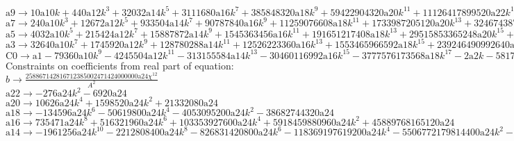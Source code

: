 \documentclass[12pt,a4paper,draft]{article}
\begin{document}
$\text{a9}\to 10 \text{a10} k+440 \text{a12} k^3+32032 \text{a14} k^5+3111680 \text{a16} k^7+385848320 \text{a18} k^9+59422904320 \text{a20} k^{11}+11126417899520 \text{a22} k^{13}+2489170300469248 \text{a24} k^{15}$\\
$\text{a7}\to 240 \text{a10} k^3+12672 \text{a12} k^5+933504 \text{a14} k^7+90787840 \text{a16} k^9+11259076608 \text{a18} k^{11}+1733987205120 \text{a20} k^{13}+324674387017728 \text{a22} k^{15}+72635234665365504 \text{a24} k^{17}+8 \text{a8} k$\\
$\text{a5}\to 4032 \text{a10} k^5+215424 \text{a12} k^7+15887872 \text{a14} k^9+1545363456 \text{a16} k^{11}+191651217408 \text{a18} k^{13}+29515853365248 \text{a20} k^{15}+5526593941929984 \text{a22} k^{17}+1236393972835811328 \text{a24} k^{19}+6 \text{a6} k+112 \text{a8} k^3$\\
$\text{a3}\to 32640 \text{a10} k^7+1745920 \text{a12} k^9+128780288 \text{a14} k^{11}+12526223360 \text{a16} k^{13}+1553465966592 \text{a18} k^{15}+239246490992640 \text{a20} k^{17}+44796883073761280 \text{a22} k^{19}+10021832059523170304 \text{a24} k^{21}+4 \text{a4} k+40 \text{a6} k^3+896 \text{a8} k^5$\\
$\text{C0}\to \text{a1}-79360 \text{a10} k^9-4245504 \text{a12} k^{11}-313155584 \text{a14} k^{13}-30460116992 \text{a16} k^{15}-3777576173568 \text{a18} k^{17}-2 \text{a2} k-581777702256640 \text{a20} k^{19}-108932957168730112 \text{a22} k^{21}-24370173276164456448 \text{a24} k^{23}-8 \text{a4} k^3-96 \text{a6} k^5-2176 \text{a8} k^7$\\
Constraints on coefficients from real part of equation:
\\$b\to \frac{258867142816712385002471424000000 \text{a24} \chi ^{12}}{A^2}$\\
$\text{a22}\to -276 \text{a24} k^2-6920 \text{a24}$\\
$\text{a20}\to 10626 \text{a24} k^4+1598520 \text{a24} k^2+21332080 \text{a24}$\\
$\text{a18}\to -134596 \text{a24} k^6-50619800 \text{a24} k^4-4053095200 \text{a24} k^2-38682744320 \text{a24}$\\
$\text{a16}\to 735471 \text{a24} k^8+516321960 \text{a24} k^6+103353927600 \text{a24} k^4+5918459880960 \text{a24} k^2+45889768165120 \text{a24}$\\
$\text{a14}\to -1961256 \text{a24} k^{10}-2212808400 \text{a24} k^8-826831420800 \text{a24} k^6-118369197619200 \text{a24} k^4-5506772179814400 \text{a24} k^2-37462825494456320 \text{a24}$\\
\end{document}
